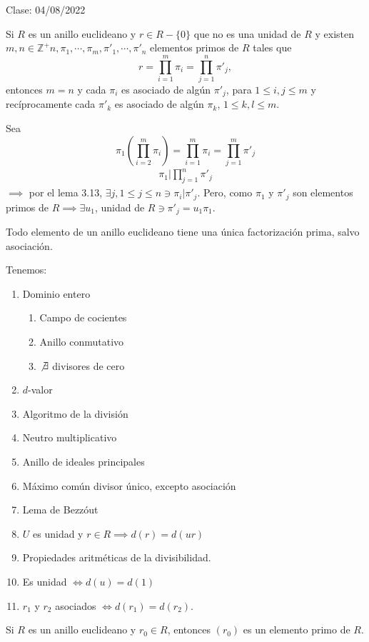 Clase: 04/08/2022

\begin{teorema}
    Si $R$ es un anillo euclideano y $r\in R-\{0\}$ que no es una unidad de $R$ y existen $m,n\in \mathbb{Z}^+n,\pi_1,\cdots, \pi_m,\pi'_1,\cdots, \pi'_n$ elementos primos de $R$ tales que 
    $$r=\prod_{i=1}^m\pi_i=\prod_{j=1}^n\pi'_j,$$
    entonces $m=n$ y cada $\pi_i$ es asociado de algún $\pi'_j$, para $1\leq i,j\leq m$ y recíprocamente cada $\pi'_k$ es asociado de algún $\pi_k$, $1\leq k,l\leq m$.
    \begin{dem}
        Sea
        $$\pi_1\left(\prod_{i=2}^m \pi_i\right)=\prod_{i=1}^m \pi_i =\prod_{j=1}^m \pi'_j$$
        \begin{align*}
            \pi_1|\prod_{j=1}^n \pi'_j
        \end{align*}
        $\implies$ por el lema 3.13, $\exists j, 1\leq j \leq n\ni \pi_i|\pi'_j$. Pero, como $\pi_1$ y $\pi'_j$ son elementos primos de $R\implies \exists u_1$, unidad de $R\ni \pi'_j =u_1\pi_1$. 
    \end{dem}
\end{teorema}

\begin{corolario}
    Todo elemento de un anillo euclideano tiene una única factorización prima, salvo asociación. 
\end{corolario}

\begin{cajita}
    \begin{nota}
        Tenemos: 
        \begin{enumerate}
            \item Dominio entero
                \begin{enumerate}
                    \item Campo de cocientes 
                    \item Anillo conmutativo 
                    \item $\not\exists$ divisores de cero
                \end{enumerate}
            \item $d$-valor
            \item Algoritmo de la división 
            \item Neutro multiplicativo 
            \item Anillo de ideales principales 
            \item Máximo común divisor único, excepto asociación
            \item Lema de Bezzóut 
            \item $U$ es unidad y $r\in R\implies d(r)=d(ur)$
            \item Propiedades aritméticas de la divisibilidad.
            \item Es unidad $\iff d(u)=d(1)$ 
            \item $r_1$ y $r_2$ asociados $\iff d(r_1)=d(r_2)$.
        \end{enumerate}
        
    \end{nota}
\end{cajita}

\begin{lema}[3.14]
    Si $R$ es un anillo euclideano y $r_0\in R$, entonces $(r_0)$ es un elemento primo de $R$. 
\end{lema}